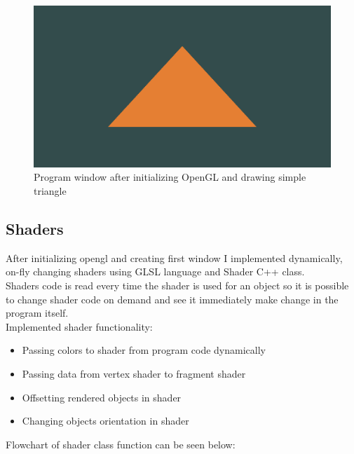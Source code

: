 \documentclass[12pt]{article}
\begin{document}
\begin{figure}[H]
    \includegraphics[width=\textwidth]{1}
    \centering
    \caption{Program window after initializing OpenGL and drawing simple triangle}
\end{figure}

\subsection{Shaders}
After initializing opengl and creating first window I implemented dynamically, on-fly changing shaders using GLSL language and Shader C++ class. \\
Shaders code is read every time the shader is used for an object so it is possible to change shader code on demand and see it immediately make change in the program itself. \\
Implemented shader functionality:
\begin{itemize}
    \item Passing colors to shader from program code dynamically 
    \item Passing data from vertex shader to fragment shader 
    \item Offsetting rendered objects in shader
    \item Changing objects orientation in shader
\end{itemize}
Flowchart of shader class function can be seen below:
\end{document}
